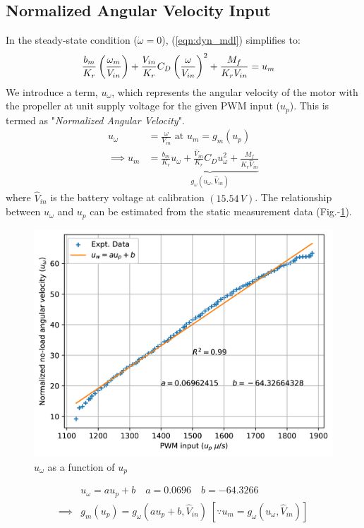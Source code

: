 \subsection{Normalized Angular Velocity Input}
In the steady-state condition ($\dot \omega = 0$), (\ref{eqn:dyn_mdl}) simplifies to:
\begin{align}
    &\frac{b_m}{K_r} \left(\frac{\omega_m}{V_{in}}\right) + \frac{V_{in}}{K_r} C_D \left( \frac{\omega}{V_{in}} \right)^2 + \frac{M_f}{K_r V_{in}} = u_m
\end{align}
We introduce a term, $u_{\omega}$, which represents the angular velocity of the motor with the propeller at unit supply voltage for the given PWM input ($u_p$). This is termed as "\textit{Normalized Angular Velocity}".
\begin{align}
    u_{\omega} &= \frac{\omega}{V_{in}} \text{  at  } u_m = g_m(u_p) \\
    \implies u_m &= \underbrace{\frac{b_m}{K_r} u_\omega + \frac{\hat V_{in}}{K_r} C_D u_\omega^2 + \frac{M_f}{K_r  \hat V_{in}}}_{g_\omega (u_\omega, \hat V_{in})}
     \label{eqn::input_def}
\end{align}
where $\hat V_{in}$ is the battery voltage at calibration $(15.54\,V)$.
The relationship between $u_\omega$ and $u_p$ can be estimated from the static
measurement data (Fig.-\ref{fig::norm_omega}).
\begin{figure}[h]
    \centering
    \includegraphics[width = \figsize]{./figs/figs_acc/norm_omega/no-load_rpm.png}
    \caption{$u_\omega$ as a function of $u_p$}
    \label{fig::norm_omega}
\end{figure}
\begin{align}
    &u_\omega = a u_p + b
    \quad a = 0.0696
    \quad b = -64.3266   \label{eqn::uw_calib}\\
    \implies& g_m(u_p) = g_\omega(a u_p  + b, \hat V_{in})
    \; [\because u_m = g_\omega(u_\omega, \hat V_{in})]
\end{align}
